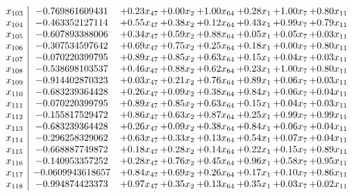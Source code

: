 \documentclass[8pt]{article}
\begin{document}
\[\begin{array}{c| c c@{\hskip 2pt} c@{\hskip 2pt} c@{\hskip 2pt} c@{\hskip 2pt} c@{\hskip 2pt} c@{\hskip 2pt} }
 x_{103}   &  -0.769861609431 & +  0.23 x_{47} & +  0.00 x_{2} & +  1.00 x_{64} & +  0.28 x_{1} & +  1.00 x_{7} & +  0.80 x_{11}\\
 x_{104}   &  -0.463352127114 & +  0.55 x_{47} & +  0.38 x_{2} & +  0.12 x_{64} & +  0.43 x_{1} & +  0.99 x_{7} & +  0.79 x_{11}\\
 x_{105}   &  -0.607893388006 & +  0.34 x_{47} & +  0.59 x_{2} & +  0.88 x_{64} & +  0.05 x_{1} & +  0.05 x_{7} & +  0.03 x_{11}\\
 x_{106}   &  -0.307534597642 & +  0.69 x_{47} & +  0.75 x_{2} & +  0.25 x_{64} & +  0.18 x_{1} & +  0.00 x_{7} & +  0.80 x_{11}\\
 x_{107}   &  -0.070220399795 & +  0.89 x_{47} & +  0.85 x_{2} & +  0.63 x_{64} & +  0.15 x_{1} & +  0.04 x_{7} & +  0.03 x_{11}\\
 x_{108}   &  -0.538698103537 & +  0.46 x_{47} & +  0.88 x_{2} & +  0.62 x_{64} & +  0.23 x_{1} & +  1.00 x_{7} & +  0.80 x_{11}\\
 x_{109}   &  -0.914402870323 & +  0.03 x_{47} & +  0.21 x_{2} & +  0.76 x_{64} & +  0.89 x_{1} & +  0.06 x_{7} & +  0.03 x_{11}\\
 x_{110}   &  -0.683239364428 & +  0.26 x_{47} & +  0.09 x_{2} & +  0.38 x_{64} & +  0.84 x_{1} & +  0.06 x_{7} & +  0.04 x_{11}\\
 x_{111}   &  -0.070220399795 & +  0.89 x_{47} & +  0.85 x_{2} & +  0.63 x_{64} & +  0.15 x_{1} & +  0.04 x_{7} & +  0.03 x_{11}\\
 x_{112}   &  -0.155817529472 & +  0.86 x_{47} & +  0.63 x_{2} & +  0.87 x_{64} & +  0.25 x_{1} & +  0.99 x_{7} & +  0.99 x_{11}\\
 x_{113}   &  -0.683239364428 & +  0.26 x_{47} & +  0.09 x_{2} & +  0.38 x_{64} & +  0.84 x_{1} & +  0.06 x_{7} & +  0.04 x_{11}\\
 x_{114}   &  -0.296258329062 & +  0.63 x_{47} & +  0.33 x_{2} & +  0.13 x_{64} & +  0.54 x_{1} & +  0.07 x_{7} & +  0.04 x_{11}\\
 x_{115}   &  -0.668887749872 & +  0.18 x_{47} & +  0.28 x_{2} & +  0.14 x_{64} & +  0.22 x_{1} & +  0.15 x_{7} & +  0.89 x_{11}\\
 x_{116}   &  -0.140953357252 & +  0.28 x_{47} & +  0.76 x_{2} & +  0.45 x_{64} & +  0.96 x_{1} & +  0.58 x_{7} & +  0.95 x_{11}\\
 x_{117}   &  -0.0609943618657 & +  0.84 x_{47} & +  0.69 x_{2} & +  0.26 x_{64} & +  0.17 x_{1} & +  0.10 x_{7} & +  0.86 x_{11}\\
 x_{118}   &  -0.994874423373 & +  0.97 x_{47} & +  0.35 x_{2} & +  0.13 x_{64} & +  0.35 x_{1} & +  0.03 x_{7} & +  0.02 x_{11}\\

\end{array}\]
\end{document}
